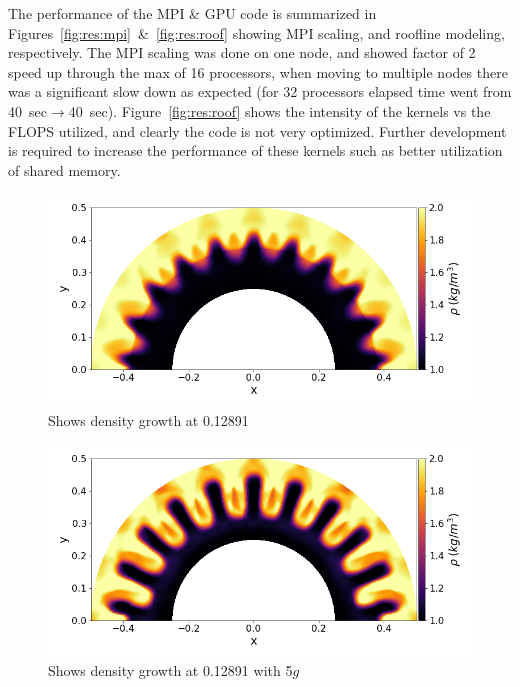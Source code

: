 \documentclass[paper=a4, fontsize=11pt]{scrartcl}
\numberwithin{equation}{section}                %
\numberwithin{figure}{section}                  %
\numberwithin{table}{section}                           %
\begin{document}
The performance of the MPI \& GPU code is summarized in Figures~\ref{fig:res:mpi}~\&~\ref{fig:res:roof} showing MPI scaling, and roofline modeling, respectively. The MPI scaling was done on one node, and showed factor of 2 speed up through the max of 16 processors, when moving to multiple nodes there was a significant slow down as expected (for 32 processors elapsed time went from \SI{40}{sec}$\rightarrow$\SI{40}{sec}). Figure~\ref{fig:res:roof} shows the intensity of the kernels vs the FLOPS utilized, and clearly the code is not very optimized. Further development is required to increase the performance of these kernels such as better utilization of shared memory. 

\begin{figure}[!htb]
  \centering
  \includegraphics[width=1.0\linewidth]{fig/560x480cpuBase}
  \caption{Shows density growth at \SI{0.12891}{}}\label{fig:res:base}
\end{figure}
\begin{figure}[!htb]
  \centering
  \includegraphics[width=1.0\linewidth]{fig/560x480cpu}
  \caption{Shows density growth at \SI{0.12891}{} with 5$g$}\label{fig:res:5g}
\end{figure}
\end{document}
